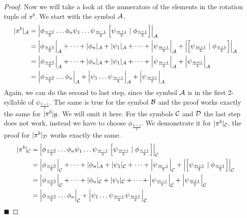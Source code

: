 \begin{proof}
	Now we will take a look at the numerators of the elements in the rotation tuple of $\pi^b$.
	We start with the symbol $\mathcal{A}$.
	\begin{align*}
		|\pi^b|_{\mathcal{A}} & = \left|\phi_{\frac{n+3}{2}} \dots \phi_n \psi_1 \dots \psi_{\frac{m-1}{2}} \left[\psi_{\frac{m+1}{2}} \mid \phi_{\frac{n+1}{2}}\right]\right|_{\mathcal{A}}                                                       \\
		           & = \left|\phi_{\frac{n+3}{2}}\right|_{\mathcal{A}} + \dots + |\phi_n|_{\mathcal{A}} + |\psi_1|_{\mathcal{A}} + \dots + \left|\psi_{\frac{m-1}{2}}\right|_{\mathcal{A}} + \left|\left[\psi_{\frac{m+1}{2}} \mid \phi_{\frac{n+1}{2}}\right]\right|_{\mathcal{A}} \\
		           & = \left|\phi_{\frac{n+3}{2}}\right|_{\mathcal{A}} + \dots + |\phi_n|_{\mathcal{A}} + |\psi_1|_{\mathcal{A}} + \dots + \left|\psi_{\frac{m-1}{2}}\right|_{\mathcal{A}} + \left|\psi_{\frac{m+1}{2}}\right|_{\mathcal{A}}                                        \\
		           & = \left|\phi_{\frac{n+3}{2}} \dots \phi_n\right|_{\mathcal{A}} + \left|\psi_1 \dots \psi_{\frac{m-1}{2}}\right|_{\mathcal{A}} + \left|\psi_{\frac{m+1}{2}}\right|_{\mathcal{A}}
	\end{align*}
	Again, we can do the second to last step, since the symbol $\mathcal{A}$ is in the first 2-syllable of $\psi_{\frac{n+1}{2}}$.
	The same is true for the symbol $\mathcal{B}$ and the proof works exactly the same for $|\pi^b|_{\mathcal{B}}$.
	We will omit it here.
	For the symbols $\mathcal{C}$ and $\mathcal{D}$ the last step does not work, instead we have to choose $\phi_{\frac{n+1}{2}}$.
	We demonstrate it for $|\pi^b|_{\mathcal{C}}$, the proof for $|\pi^b|_{\mathcal{D}}$ works exactly the same.
	\begin{align*}
		|\pi^b|_{\mathcal{C}} & = \left|\phi_{\frac{n+3}{2}} \dots \phi_n \psi_1 \dots \psi_{\frac{m-1}{2}} \left[\psi_{\frac{m+1}{2}} \mid \phi_{\frac{n+1}{2}}\right]\right|_{\mathcal{C}}                                                       \\
		           & = \left|\phi_{\frac{n+3}{2}}\right|_{\mathcal{C}} + \dots + |\phi_n|_{\mathcal{A}} + |\psi_1|_{\mathcal{C}} + \dots + \left|\psi_{\frac{m-1}{2}}\right|_{\mathcal{C}} + \left|\left[\psi_{\frac{m+1}{2}} \mid \phi_{\frac{n+1}{2}}\right]\right|_{\mathcal{C}} \\
		           & = \left|\phi_{\frac{n+3}{2}}\right|_{\mathcal{C}} + \dots + |\phi_n|_{\mathcal{C}} + |\psi_1|_{\mathcal{C}} + \dots + \left|\psi_{\frac{m-1}{2}}\right|_{\mathcal{C}} + \left|\psi_{\frac{m+1}{2}}\right|_{\mathcal{C}}                                        \\
		           & = \left|\phi_{\frac{n+3}{2}} \dots \phi_n\right|_{\mathcal{C}} + \left|\psi_1 \dots \psi_{\frac{m-1}{2}} \psi_{\frac{m+1}{2}}\right|_{\mathcal{C}}
	\end{align*}
	\hfill $\blacksquare$
\end{proof}

